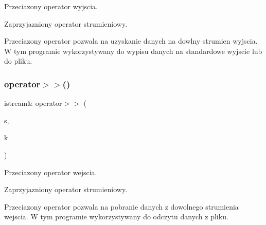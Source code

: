 Przeciazony operator wyjscia. 

Zaprzyjazniony operator strumieniowy.

Przeciazony operator pozwala na uzyskanie danych na dowlny strumien wyjscia. W tym programie wykorzystywany do wypisu danych na standardowe wyjscie lub do pliku. \mbox{\label{_ksiegarnia_01internetowa_8cpp_a7d80d3814dfd9ebbef98fd6de3aa46b5}} 
\subsubsection{operator$>$$>$()}
{\footnotesize\ttfamily istream\& operator$>$$>$ (\begin{DoxyParamCaption}\item[{istream \&}]{s,  }\item[{\textbf{ Ksiegarnia\+Internetowa} \&}]{k }\end{DoxyParamCaption})}



Przeciazony operator wejscia. 

Zaprzyjazniony operator strumieniowy.

Przeciazony operator pozwala na pobranie danych z dowolnego strumienia wejscia. W tym programie wykorzystywany do odczytu danych z pliku. 
